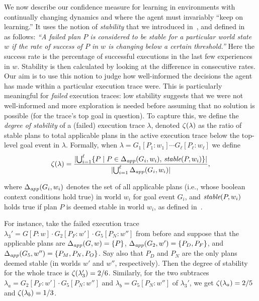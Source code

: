 We now describe our confidence measure for learning in environments with continually changing dynamics and where the agent must invariably ``keep on learning.'' It uses the notion of {\em stability} that we introduced in~\cite{airiau09:enhancing}, and defined in ~\cite{singh10:learning} as follows:
%
\emph{``A failed plan $P$ is considered to be stable for a particular world state $w$ if the rate of success of $P$ in $w$ is changing below a certain threshold.''}
Here the success rate is the percentage of successful executions in the last few experiences in $w$. Stability is then calculated by looking at the difference in consecutive rates.
%
Our aim is to use this notion to judge how  well-informed the decisions the agent has made within a particular execution trace were. This is particularly meaningful for \emph{failed} execution traces: low stability suggests that we were not well-informed and more exploration is needed before assuming that no solution is possible (for the trace's top goal in question).
To capture this, we define the \emph{degree of stability} of a (failed) execution trace $\lambda$, denoted $\zeta(\lambda)$ as the ratio of stable plans to total applicable plans in the active execution trace below the top-level goal event in $\lambda$. Formally, when $\lambda= G_1[P_1:w_1] \cdots G_\ell[P_\ell:w_\ell]$ we define 
\[
\zeta(\lambda) = 
	\frac{ 
			|{ \bigcup_{i=1}^\ell \{P \mid P \in \Delta_{\operatorname{\textit{app}}}(G_i,w_i),\, \operatorname{\textit{stable}}(P,w_i)\} }| 
		}
		{
			|{	\bigcup_{i=1}^\ell \Delta_{\operatorname{\textit{app}}}(G_i,w_i) }| 
		},
\]

\noindent
where  $\Delta_{\operatorname{\textit{app}}}(G_i,w_i)$ denotes the set of all applicable plans (i.e., whose boolean context conditions hold true) in world $w_i$ for goal event $G_i$, and $\operatorname{\textit{stable}}(P,w_i)$ holds true if plan $P$ is deemed stable in world $w_i$, as defined in~\cite{singh10:learning}.

For instance, take the failed execution trace $\lambda_3' = G[P:w] \cdot G_2[P_F:w'] \cdot G_5[P_N:w'']$ from before and suppose that the applicable plans are $\Delta_{\operatorname{\textit{app}}}(G,w) = \{P\}$, $\Delta_{\operatorname{\textit{app}}}(G_2,w') = \{P_D,P_F\}$, and $\Delta_{\operatorname{\textit{app}}}(G_5,w'') = \{P_M,P_N,P_O\}$. Say also that $P_D$ and $P_N$ are the only plans deemed stable (in worlds $w'$ and $w''$, respectively). 
Then the degree of stability for the whole trace is $\zeta(\lambda_3')= 2/6$.
Similarly, for the two subtraces $\lambda_a= G_2[P_F:w'] \cdot G_5[P_N:w'']$ and $\lambda_b =G_5[P_N:w'']$ of $\lambda_3'$, we get $\zeta(\lambda_a) = 2/5$ and $\zeta(\lambda_b) = 1/3$.



